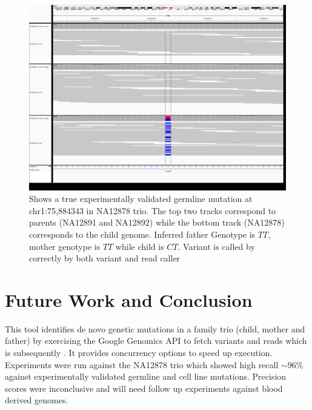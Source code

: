 \documentclass{article}
\begin{document}
\begin{figure}[!ht]
  \centering
  \includegraphics[width=6in]{chr1_75,884,323_75,884,363.png}
  \caption{Shows a true experimentally validated germline mutation at chr1:75,884343 in NA12878 trio. The top two tracks correspond to parents (NA12891 and NA12892) while the bottom track (NA12878) corresponds to the child genome. Inferred father Genotype is $TT$, mother genotype is $TT$ while child is $CT$. Variant is called by correctly by both variant and read caller}
   \label{fig:germline}
\end{figure}


\section{Future Work and Conclusion}
This tool identifies de novo genetic mutations in a family trio (child, mother and father) by exercising the Google Genomics API to fetch variants and reads which is subsequently  . It provides concurrency options to speed up execution. Experiments were run against the NA12878 trio which showed high recall $\sim 96\%$ against experimentally validated germline and cell line mutations. Precision scores were inconclusive and will need follow up experiments against blood derived genomes.
\end{document}

